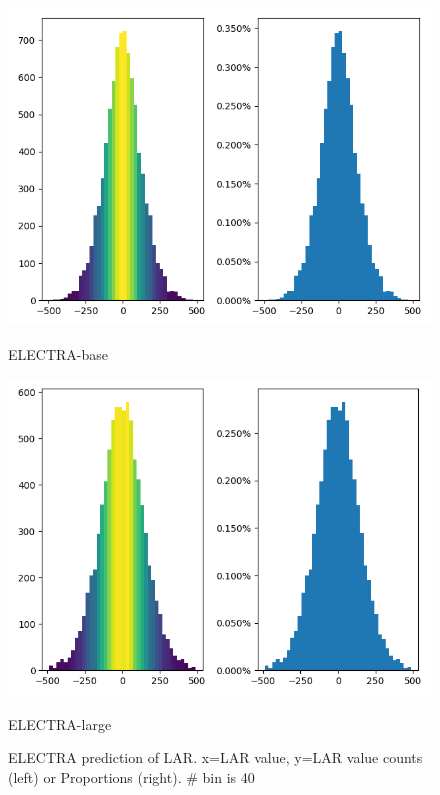 \documentclass[letterpaper]{article} %
\begin{document}
\begin{figure}[!ht]
\centering
\begin{minipage}[b]{0.45\textwidth}
    \includegraphics[width=\textwidth]{SWOW_electra_base.png}
    \caption*{ELECTRA-base}
  \end{minipage}
  \hfill
  \begin{minipage}[b]{0.45\textwidth}
    \includegraphics[width=\textwidth]{SWOW_electra_large.png}
    \caption*{ELECTRA-large}
  \end{minipage}
\caption{ELECTRA prediction of LAR. x=LAR value, y=LAR value counts (left) or Proportions (right). \# bin is 40}
\label{fig:larelectra}

\end{figure}
\end{document}
